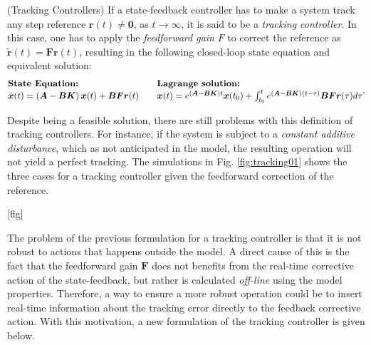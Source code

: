 \documentclass[a4paper,11pt]{book}
\numberwithin{figure}{chapter}
\numberwithin{equation}{chapter}
\numberwithin{table}{chapter}
\theoremstyle{definition}
\newtheorem{definition}{Definition}[chapter]
\newcounter{boxed-theorem}
\newcounter{boxed-definition}
\newenvironment{boxed-definition}[1]
{\begin{shaded} \begin{definition}{#1}}
{\end{definition} \end{shaded}}
\begin{document}
\begin{boxed-definition}{(Tracking Controllers)} \label{def:tracking}
    If a state-feedback controller has to make a system track any step reference $\bm{r}(t) \neq \bm{0}$, as $t \to \infty$, it is said to be a \textit{tracking controller}. In this case, one has to apply the \textit{feedforward gain} $F$ to correct the reference as $\tilde{\bm{r}}(t) = \bm{F}\bm{r}(t)$, resulting in the following closed-loop state equation and equivalent solution:
    \begin{align}
    \begin{matrix*}[l]
    \textbf{State Equation:} \hfill & & \textbf{Lagrange solution:} \hfill \\
    \dot{\bm{x}}(t) = \left( \bm{A} - \bm{B} \bm{K} \right) \bm{x}(t) + \bm{B} \bm{F} \bm{r}(t)  & &
    \bm{x}(t) = e^{(\bm{A} - \bm{B} \bm{K}) t} \bm{x}(t_0) + \int_{t_0}^{t} e^{(\bm{A} - \bm{B} \bm{K}) (t - \tau)} \bm{B} \bm{F} \bm{r}(\tau) d \tau \hfill
    \end{matrix*}
    .\end{align}
\end{boxed-definition}

Despite being a feasible solution, there are still problems with this definition of tracking controllers. For instance, if the system is subject to a \textit{constant additive disturbance}, which as not anticipated in the model, the resulting operation will not yield a perfect tracking. The simulations in Fig. \ref{fig:tracking01} shows the three cases for a tracking controller given the feedforward correction of the reference.

[fig]

The problem of the previous formulation for a tracking controller is that it is not robust to actions that happens outside the model. A direct cause of this is the fact that the feedforward gain $\bm{F}$ does not benefits from the real-time corrective action of the state-feedback, but rather is calculated \textit{off-line} using the model properties. Therefore, a way to ensure a more robust operation could be to insert real-time information about the tracking error directly to the feedback corrective action. With this motivation, a new formulation of the tracking controller is given below.
\end{document}
